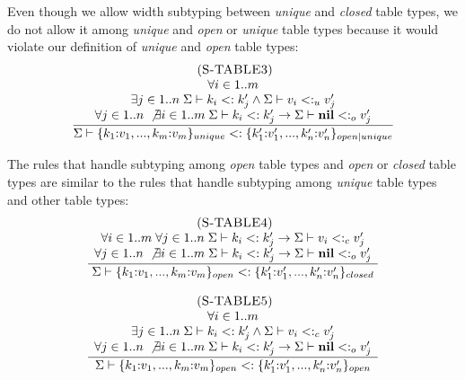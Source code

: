 Even though we allow width subtyping between \emph{unique} and \emph{closed}
table types, we do not allow it among \emph{unique} and \emph{open} or
\emph{unique} table types because it would violate our definition of
\emph{unique} and \emph{open} table types:
\[
\begin{array}{c}
\; (\textsc{S-TABLE3})\\
\dfrac{\begin{array}{c}
       \forall i \in 1..m \\
       \exists j \in 1..n \;
       \Sigma \vdash k_{i} <: k_{j}' \land \Sigma \vdash v_{i} <:_{u} v_{j}' \\
       \forall j \in 1..n \; \not\exists i \in 1..m \;
       \Sigma \vdash k_{i} <: k_{j}' \to \Sigma \vdash \mathbf{nil} <:_{o} v_{j}'
       \end{array}}
      {\Sigma \vdash \{k_{1}{:}v_{1}, ..., k_{m}{:}v_{m}\}_{unique} <:
                    \{k_{1}'{:}v_{1}', ..., k_{n}'{:}v_{n}'\}_{open|unique}}
\end{array}
\]

The rules that handle subtyping among \emph{open} table types and
\emph{open} or \emph{closed} table types are similar to the rules
that handle subtyping among \emph{unique} table types and other table types:
\[
\begin{array}{c}
\begin{array}{c}
\; (\textsc{S-TABLE4})\\
\dfrac{\begin{array}{c}
       \forall i \in 1..m \; \forall j \in 1..n \;
       \Sigma \vdash k_{i} <: k_{j}' \to \Sigma \vdash v_{i} <:_{c} v_{j}' \\
       \forall j \in 1..n \; \not\exists i \in 1..m \;
       \Sigma \vdash k_{i} <: k_{j}' \to \Sigma \vdash \mathbf{nil} <:_{o} v_{j}'
       \end{array}}
      {\Sigma \vdash \{k_{1}{:}v_{1}, ..., k_{m}{:}v_{m}\}_{open} <:
                    \{k_{1}'{:}v_{1}', ..., k_{n}'{:}v_{n}'\}_{closed}}
\end{array}
\\ \\
\begin{array}{c}
\; (\textsc{S-TABLE5})\\
\dfrac{\begin{array}{c}
       \forall i \in 1..m \\
       \exists j \in 1..n \;
       \Sigma \vdash k_{i} <: k_{j}' \land \Sigma \vdash v_{i} <:_{c} v_{j}' \\
       \forall j \in 1..n \; \not\exists i \in 1..m \;
       \Sigma \vdash k_{i} <: k_{j}' \to \Sigma \vdash \mathbf{nil} <:_{o} v_{j}'
       \end{array}}
      {\Sigma \vdash \{k_{1}{:}v_{1}, ..., k_{m}{:}v_{m}\}_{open} <:
                    \{k_{1}'{:}v_{1}', ..., k_{n}'{:}v_{n}'\}_{open}}
\end{array}
\end{array}
\]

